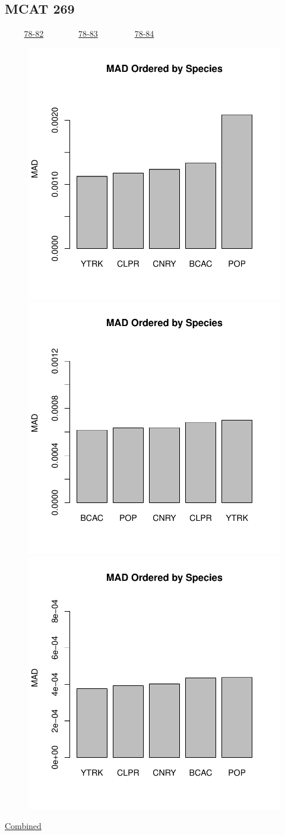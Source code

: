 \documentclass[ xcolor = pdftex, dvipsnames, table ]{beamer}
\begin{document}
\subsection{MCAT 269}
\begin{frame}{$~~~~~~~~~$ \href{https://github.com/gasduster99/sppComp/tree/master/sscRuns/26919781982M4}{78-82} $~~~~~~~~~~~~~~~~$ \href{https://github.com/gasduster99/sppComp/tree/master/sscRuns/26919781983M4}{78-83} $~~~~~~~~~~~~~~~~~$ \href{https://github.com/gasduster99/sppComp/tree/master/sscRuns/26919781984M4}{78-84} }
        \begin{figure}[ht!]
        \centering
        \hspace*{-1cm}
        \includegraphics[width=.4\textwidth]{../sscRuns/26919781982M4/sppHeadMad68.pdf}
        \includegraphics[width=.4\textwidth]{../sscRuns/26919781983M4/sppHeadMad68.pdf}
        \includegraphics[width=.4\textwidth]{../sscRuns/26919781984M4/sppHeadMad68.pdf}
        \end{figure}
	\vspace{-1cm}
	\begin{center}
	\Large
	\href{https://github.com/gasduster99/sppComp/tree/master/try1/postSSC/26919781982345M4}{Combined}
	\end{center}
\end{frame}
\end{document}
